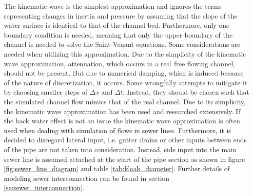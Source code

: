 The kinematic wave is the simplest approximation and ignores the terms representing changes in inertia and pressure by assuming that the slope of the water surface is identical to that of the channel bed. Furthermore, only one boundary condition is needed, meaning that only the upper boundary of the channel is needed to solve the Saint-Venant equations.  
Some considerations are needed when utilizing this approximation.      
Due to the simplicity of the kinematic wave approximation, attenuation, which occurs in a real free flowing channel, should not be present. But due to numerical damping, which is induced because of the nature of discretization, it occurs. Some wrongfully attempts to mitigate it by choosing smaller steps of $\Delta x$ and $\Delta t$. Instead, they should be chosen such that the simulated channel flow mimics that of the real channel.
Due to its simplicity, the kinematic wave approximation has been used and researched extensively. If the back water effect is not an issue the kinematic wave approximation is often used when dealing with simulation of flows in sewer lines. Furthermore, it is decided to disregard lateral input, i.e. gutter drains or other inputs between ends of the pipe are not taken into consideration. 
Instead, side input into the main sewer line is assumed attached at the start of the pipe section as shown in figure \ref{fig:sewer_line_diagram} and table \ref{tab:kloak_diameter}. Further details of modeling sewer interconnection can be found in section \ref{se:sewer_interconnection}. 






